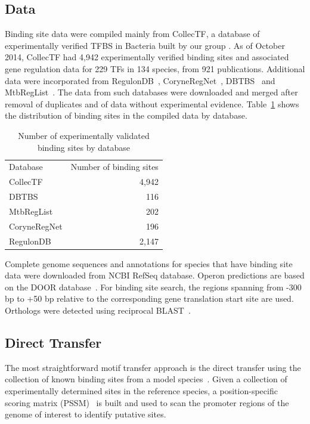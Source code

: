 \documentclass[]{llncs}
\begin{document}
\subsection{Data}
Binding site data were compiled mainly from CollecTF, a database of
experimentally verified TFBS in Bacteria built by our group
\cite{kilic2013collectf}. As of October 2014, CollecTF had 4,942 experimentally
verified binding sites and associated gene regulation data for 229 TFs in 134
species, from 921 publications. Additional data were incorporated from
RegulonDB~\cite{salgado2013regulondb},
CoryneRegNet~\cite{pauling2012coryneregnet}, DBTBS~\cite{sierro2008dbtbs} and
MtbRegList~\cite{jacques2005mtbreglist}. The data from such databases were
downloaded and merged after removal of duplicates and of data without
experimental evidence. Table~\ref{tab:num_sites} shows the distribution of
binding sites in the compiled data by database.


\begin{table}{}
  \centering
  \caption{Number of experimentally validated binding sites by database}
  \begin{tabular}{lr}
    \hline\noalign{\smallskip}
    Database & Number of binding sites \\
    \noalign{\smallskip}
    \hline
    \noalign{\smallskip}
    CollecTF      &  4,942\\
    DBTBS         &  116\\
    MtbRegList    &  202\\
    CoryneRegNet  &  196\\
    RegulonDB     & 2,147\\
    \hline
    \end{tabular}
\label{tab:num_sites}
\end{table}

Complete genome sequences and annotations for species that have binding site
data were downloaded from NCBI RefSeq database. Operon predictions are based on
the DOOR database~\cite{mao2009door}. For binding site search, the regions
spanning from -300 bp to +50 bp relative to the corresponding gene translation
start site are used. Orthologs were detected using reciprocal
BLAST~\cite{wall2003detecting}.

\subsection{Direct Transfer}
The most straightforward motif transfer approach is the direct transfer using the
collection of known binding sites from a model
species~\cite{kazakov2009comparative, rodionov2011comparative}. Given a
collection of experimentally determined sites in the reference species, a
position-specific scoring matrix (PSSM)~\cite{stormo2000dna} is built and used
to scan the promoter regions of the genome of interest to identify putative
sites.
\end{document}

